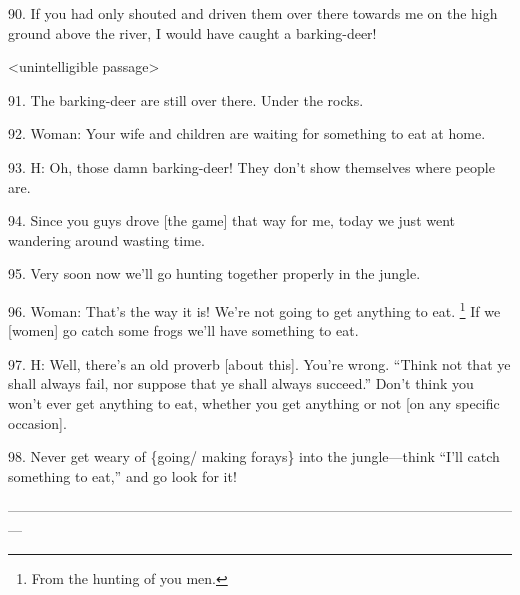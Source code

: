 90. If you had only shouted and driven them over there towards me on the high ground
above the river, I would have caught a barking-deer!

<unintelligible passage>

91. The barking-deer are still over there. Under the rocks.

92. Woman: Your wife and children are waiting for something to eat at home.

93. H: Oh, those damn barking-deer! They don't show themselves where people are.

94. Since you guys drove [the game] that way for me, today we just went wandering
around wasting time.

95. Very soon now we'll go hunting together properly in the jungle.

96. Woman: That's the way it is! We're not going to get anything to eat. \footnote{From the hunting of you men.} If
we [women] go catch some frogs we'll have something to eat.

97. H: Well, there's an old proverb [about this]. You're wrong. ``Think not that
ye shall always fail, nor suppose that ye shall always succeed.'' Don't think you
won't ever get anything to eat, whether you get anything or not [on any specific
occasion].

98. Never get weary of \{going/ making forays\} into the jungle---think ``I'll
catch something to eat,'' and go look for it!

---------------------------------------------------------------------------------------------------------------

